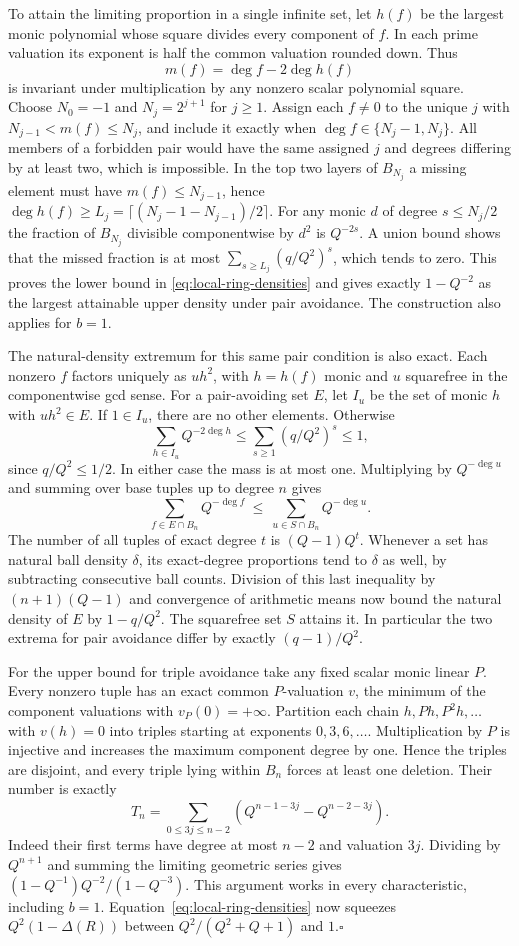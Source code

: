 To attain the limiting proportion in a single infinite set, let
$h(f)$ be the largest monic polynomial whose square divides every
component of $f$. In each prime valuation its exponent is half the common
valuation rounded down. Thus
\[
 m(f)=\deg f-2\deg h(f)
\]
is invariant under multiplication by any nonzero scalar polynomial square.
Choose $N_0=-1$ and $N_j=2^{j+1}$ for $j\ge1$. Assign each $f\ne0$
to the unique $j$ with $N_{j-1}<m(f)\le N_j$, and include it exactly
when $\deg f\in\{N_j-1,N_j\}$. All members of a forbidden pair
would have the same assigned $j$ and degrees differing by at least two,
which is impossible. In the top two layers of $B_{N_j}$ a missing
element must have $m(f)\le N_{j-1}$, hence
$\deg h(f)\ge L_j=\lceil(N_j-1-N_{j-1})/2\rceil$.
For any monic $d$ of degree $s\le N_j/2$ the fraction of $B_{N_j}$
divisible componentwise by $d^2$ is $Q^{-2s}$. A union bound
shows that the missed fraction is at most
$\sum_{s\ge L_j}(q/Q^2)^s$, which tends to zero. This proves the
lower bound in \eqref{eq:local-ring-densities} and gives exactly
$1-Q^{-2}$ as the largest attainable upper density under pair avoidance.
The construction also applies for $b=1$.

The natural-density extremum for this same pair condition is also exact.
Each nonzero $f$ factors uniquely as $u h^2$, with $h=h(f)$ monic
and $u$ squarefree in the componentwise gcd sense. For a pair-avoiding
set $E$, let $I_u$ be the set of monic $h$ with $u h^2\in E$.
If $1\in I_u$, there are no other elements. Otherwise
\[
  \sum_{h\in I_u}Q^{-2\deg h}
  \le \sum_{s\ge1}(q/Q^2)^s\le1,
\]
since $q/Q^2\le1/2$. In either case the mass is at most one.
Multiplying by $Q^{-\deg u}$ and summing over base tuples up to degree $n$
gives
\[
  \sum_{f\in E\cap B_n}Q^{-\deg f}
  \ \le\ \sum_{u\in S\cap B_n}Q^{-\deg u}.
\]
The number of all tuples of exact degree $t$ is $(Q-1)Q^t$.
Whenever a set has natural ball density $\delta$, its exact-degree
proportions tend to $\delta$ as well, by subtracting consecutive ball
counts. Division of this last inequality by $(n+1)(Q-1)$ and
convergence of arithmetic means now bound the natural density of $E$ by
$1-q/Q^2$. The squarefree set $S$ attains it. In particular the two
extrema for pair avoidance differ by exactly $(q-1)/Q^2$.

For the upper bound for triple avoidance take any fixed scalar monic linear $P$. Every
nonzero tuple has an exact common $P$-valuation $v$, the minimum of
the component valuations with $v_P(0)=+\infty$. Partition each chain
$h,Ph,P^2h,\ldots$ with $v(h)=0$ into triples starting at exponents
$0,3,6,\ldots$. Multiplication by $P$ is injective and increases the
maximum component degree by one. Hence the triples are disjoint, and
every triple lying within $B_n$ forces at least one deletion. Their
number is exactly
\[
 T_n=\sum_{0\le 3j\le n-2}
 (Q^{n-1-3j}-Q^{n-2-3j}).
\]
Indeed their first terms have degree at most $n-2$ and valuation $3j$.
Dividing by $Q^{n+1}$ and summing the limiting geometric series gives
$(1-Q^{-1})Q^{-2}/(1-Q^{-3})$. This argument works in every
characteristic, including $b=1$. Equation~\eqref{eq:local-ring-densities}
now squeezes $Q^2(1-\Delta(R))$ between $Q^2/(Q^2+Q+1)$ and $1$.\hfill$\square$


